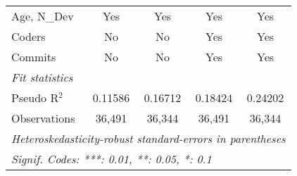 \begin{tabular}{lcccc}
   Age, N\_Dev                                           & Yes                & Yes                & Yes                & Yes\\  
   Coders                                                & No                 & No                 & Yes                & Yes\\  
   Commits                                               & No                 & No                 & Yes                & Yes\\  
   \midrule
   \emph{Fit statistics}\\
   Pseudo R$^2$                                          & 0.11586            & 0.16712            & 0.18424            & 0.24202\\  
   Observations                                          & 36,491             & 36,344             & 36,491             & 36,344\\  
   \midrule \midrule
   \multicolumn{5}{l}{\emph{Heteroskedasticity-robust standard-errors in parentheses}}\\
   \multicolumn{5}{l}{\emph{Signif. Codes: ***: 0.01, **: 0.05, *: 0.1}}\\
\end{tabular}
\par\endgroup


